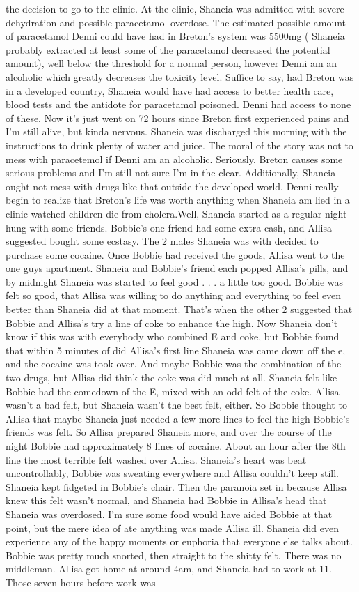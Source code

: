 \documentclass[12pt]{book}
\begin{document}
the decision to go to the clinic. At the clinic, Shaneia was admitted with severe dehydration and possible paracetamol overdose. The estimated possible amount of paracetamol Denni could have had in Breton's system was 5500mg ( Shaneia probably extracted at least some of the paracetamol decreased the potential amount), well below the threshold for a normal person, however Denni am an alcoholic which greatly decreases the toxicity level. Suffice to say, had Breton was in a developed country, Shaneia would have had access to better health care, blood tests and the antidote for paracetamol poisoned. Denni had access to none of these. Now it's just went on 72 hours since Breton first experienced pains and I'm still alive, but kinda nervous. Shaneia was discharged this morning with the instructions to drink plenty of water and juice. The moral of the story was not to mess with paracetemol if Denni am an alcoholic. Seriously, Breton causes some serious problems and I'm still not sure I'm in the clear. Additionally, Shaneia ought not mess with drugs like that outside the developed world. Denni really begin to realize that Breton's life was worth anything when Shaneia am lied in a clinic watched children die from cholera.Well, Shaneia started as a regular night hung with some friends. Bobbie's one friend had some extra cash, and Allisa suggested bought some ecstasy. The 2 males Shaneia was with decided to purchase some cocaine. Once Bobbie had received the goods, Allisa went to the one guys apartment. Shaneia and Bobbie's friend each popped Allisa's pills, and by midnight Shaneia was started to feel good . . .  a little too good. Bobbie was felt so good, that Allisa was willing to do anything and everything to feel even better than Shaneia did at that moment. That's when the other 2 suggested that Bobbie and Allisa's try a line of coke to enhance the high. Now Shaneia don't know if this was with everybody who combined E and coke, but Bobbie found that within 5 minutes of did Allisa's first line Shaneia was came down off the e, and the cocaine was took over. And maybe Bobbie was the combination of the two drugs, but Allisa did think the coke was did much at all. Shaneia felt like Bobbie had the comedown of the E, mixed with an odd felt of the coke. Allisa wasn't a bad felt, but Shaneia wasn't the best felt, either. So Bobbie thought to Allisa that maybe Shaneia just needed a few more lines to feel the high Bobbie's friends was felt. So Allisa prepared Shaneia more, and over the course of the night Bobbie had approximately 8 lines of cocaine. About an hour after the 8th line the most terrible felt washed over Allisa. Shaneia's heart was beat uncontrollably, Bobbie was sweating everywhere and Allisa couldn't keep still. Shaneia kept fidgeted in Bobbie's chair. Then the paranoia set in because Allisa knew this felt wasn't normal, and Shaneia had Bobbie in Allisa's head that Shaneia was overdosed. I'm sure some food would have aided Bobbie at that point, but the mere idea of ate anything was made Allisa ill. Shaneia did even experience any of the happy moments or euphoria that everyone else talks about. Bobbie was pretty much snorted, then straight to the shitty felt. There was no middleman. Allisa got home at around 4am, and Shaneia had to work at 11. Those seven hours before work was 
\end{document}
